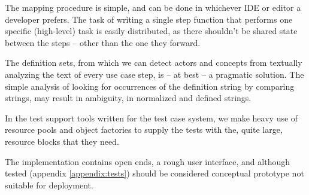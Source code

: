 \noindent The mapping procedure is simple, and can be done in whichever IDE or editor a developer prefers. The task of writing a single step function that performs one specific (high-level) task is easily distributed, as there shouldn't be shared state between the steps -- other than the one they forward.\medskip

\noindent The definition sets, from which we can detect actors and concepts from textually analyzing the text of every use case step, is -- at best -- a pragmatic solution. The simple analysis of looking for occurrences of the definition string by comparing strings, may result in ambiguity, in normalized and defined strings.\medskip

\noindent In the test support tools written for the test case system, we make heavy use of resource pools and object factories to supply the tests with the, quite large, resource blocks that they need.\medskip

\noindent The implementation contains open ends, a rough user interface, and although tested (appendix \ref{appendix:tests}) should be considered conceptual prototype not suitable for deployment.
